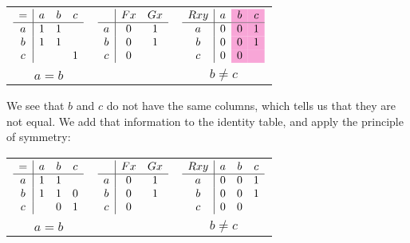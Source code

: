 \documentclass[PHIL101-Textbook.tex]{subfiles}
\begin{document}
\begin{center}
  \begin{tabular}{ccc}
   $\begin{array}{c|ccc}
	   = & a & b & c\\ \hline
	   a & 1 & 1 &\\
	   b & 1 & 1 &\\
	   c & &   & 1
	\end{array}$
	 &
   $\begin{array}{c|cc}
	  & \mathord{F}{x} & \mathord{G}{x}\\ \hline
	  a & 0 & 1 \\
	  b & 0 & 1 \\
	  c & 0 &
	\end{array}$
	 &
	$\begin{array}{c|ccc}
	  \atom R {xy} & a & \cellcolor{magenta!35} b & \cellcolor{magenta!35} c\\ \hline
	  a & \vF& \cellcolor{magenta!35}\vF & \cellcolor{magenta!35}\vT \\
	  b & \vF& \cellcolor{magenta!35}\vF & \cellcolor{magenta!35}\vT \\
	  c & \vF& \cellcolor{magenta!35}\vF & \cellcolor{magenta!35}
				\end{array}$\\
	$a=b$ && $b\neq c$
  \end{tabular}
\end{center}

\noindent We see that $b$ and $c$ do not have the same columns, which tells us that they are not equal. We add that information to the identity table, and apply the principle of symmetry:

\begin{center}
  \begin{tabular}{ccc}
   $\begin{array}{c|ccc}
	   = & a & b & c\\ \hline
	   a & 1 & 1 &\\
	   b & 1 & 1 & 0\\
	   c &     & 0 & 1
	\end{array}$
	 &
   $\begin{array}{c|cc}
	  & \mathord{F}{x} & \mathord{G}{x}\\ \hline
	  a & 0 & 1 \\
	  b & 0 & 1 \\
	  c & 0 &
	\end{array}$
	 &
   $\begin{array}{c|ccc}
	  \mathord{R}{xy} & a & b & c\\ \hline
	  a & 0& 0 & 1 \\
	  b & 0& 0 & 1 \\
	  c & 0& 0 & 
	\end{array}$\\
	$a=b$ && $b\neq c$
  \end{tabular}
\end{center}
\end{document}
